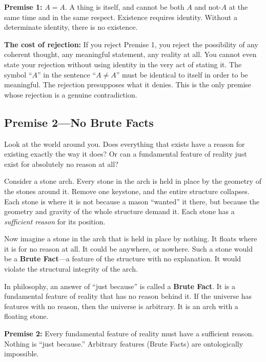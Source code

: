 \documentclass[11pt]{article}
\theoremstyle{canonstyle}
\begin{document}
\begin{keyresult}
\textbf{Premise 1:} $A = A$. A thing is itself, and cannot be both $A$ and not-$A$ at the same time and in the same respect. Existence requires identity. Without a determinate identity, there is no existence.
\end{keyresult}

\textbf{The cost of rejection:} If you reject Premise 1, you reject the possibility of any coherent thought, any meaningful statement, any reality at all. You cannot even state your rejection without using identity in the very act of stating it. The symbol ``$A$'' in the sentence ``$A \neq A$'' must be identical to itself in order to be meaningful. The rejection presupposes what it denies. This is the only premise whose rejection is a genuine contradiction.

\subsection{Premise 2---No Brute Facts}

\begin{reflect}
Look at the world around you. Does everything that exists have a reason for existing exactly the way it does? Or can a fundamental feature of reality just exist for absolutely no reason at all?
\end{reflect}

Consider a stone arch. Every stone in the arch is held in place by the geometry of the stones around it. Remove one keystone, and the entire structure collapses. Each stone is where it is not because a mason ``wanted'' it there, but because the geometry and gravity of the whole structure demand it. Each stone has a \emph{sufficient reason} for its position.

Now imagine a stone in the arch that is held in place by nothing. It floats where it is for no reason at all. It could be anywhere, or nowhere. Such a stone would be a \textbf{Brute Fact}---a feature of the structure with no explanation. It would violate the structural integrity of the arch.

In philosophy, an answer of ``just because'' is called a \textbf{Brute Fact}. It is a fundamental feature of reality that has no reason behind it. If the universe has features with no reason, then the universe is arbitrary. It is an arch with a floating stone.

\begin{keyresult}
\textbf{Premise 2:} Every fundamental feature of reality must have a sufficient reason. Nothing is ``just because.'' Arbitrary features (Brute Facts) are ontologically impossible.
\end{keyresult}
\end{document}
